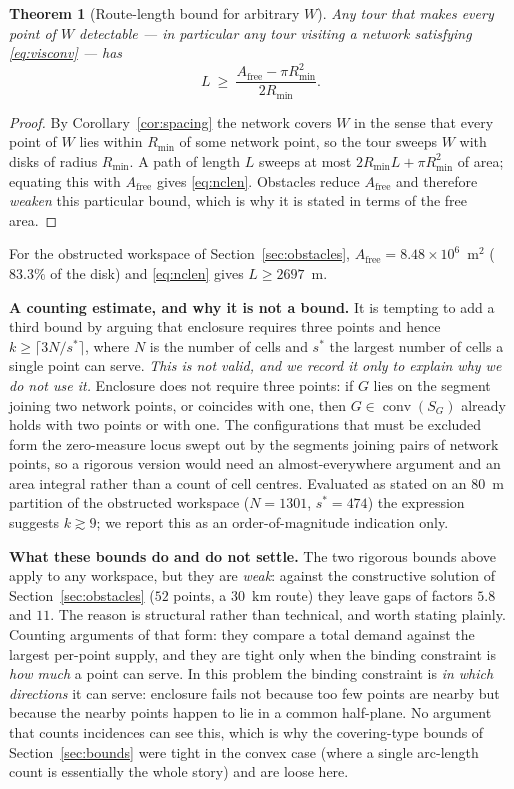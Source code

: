\documentclass[preprint,12pt,3p]{elsarticle}
\newtheorem{theorem}{Theorem}
\theoremstyle{definition}
\newenvironment{bproof}{\begin{proof}}{\end{proof}}
\newcommand{\conv}{\operatorname{conv}}
\newcommand{\Rmin}{R_{\min}}
\begin{document}
\begin{theorem}[Route-length bound for arbitrary $W$]
\label{thm:nclen}
Any tour that makes every point of $W$ detectable --- in particular any tour visiting a network
satisfying \eqref{eq:visconv} --- has
\begin{equation}
L\ \ge\ \frac{A_{\mathrm{free}}-\pi\Rmin^2}{2\Rmin}.
\label{eq:nclen}
\end{equation}
\end{theorem}
\begin{bproof}
By Corollary~\ref{cor:spacing} the network covers $W$ in the sense that every point of $W$ lies
within $\Rmin$ of some network point, so the tour sweeps $W$ with disks of radius $\Rmin$. A path
of length $L$ sweeps at most $2\Rmin L+\pi\Rmin^2$ of area; equating this with
$A_{\mathrm{free}}$ gives \eqref{eq:nclen}. Obstacles reduce $A_{\mathrm{free}}$ and therefore
\emph{weaken} this particular bound, which is why it is stated in terms of the free area.
\end{bproof}

For the obstructed workspace of Section~\ref{sec:obstacles},
$A_{\mathrm{free}}=8.48\times10^6$~m$^2$ ($83.3\%$ of the disk) and
\eqref{eq:nclen} gives $L\ge2697$~m.

\noindent\textbf{A counting estimate, and why it is not a bound.} It is tempting to add a third
bound by arguing that enclosure requires three points and hence
$k\ge\lceil 3N/s^\ast\rceil$, where $N$ is the number of cells and $s^\ast$ the largest number of
cells a single point can serve. \emph{This is not valid, and we record it only to explain why we do
not use it.} Enclosure does not require three points: if $G$ lies on the segment joining two
network points, or coincides with one, then $G\in\conv(S_G)$ already holds with two points or with
one. The configurations that must be excluded form the zero-measure locus swept out by the
segments joining pairs of network points, so a rigorous version would need an almost-everywhere
argument and an area integral rather than a count of cell centres. Evaluated as stated on an
$80$~m partition of the obstructed workspace ($N=1301$, $s^\ast=474$) the expression suggests
$k\gtrsim9$; we report this as an order-of-magnitude indication only.

\noindent\textbf{What these bounds do and do not settle.} The two rigorous bounds above apply to any workspace, but they are \emph{weak}: against the constructive solution of
Section~\ref{sec:obstacles} ($52$ points, a $30$~km route) they leave gaps of factors $5.8$ and
$11$. The reason is structural rather than technical, and worth stating plainly. Counting arguments of that form: they compare a total demand against the largest
per-point supply, and they are tight only when the binding constraint is \emph{how much} a point
can serve. In this problem the binding constraint is \emph{in which directions} it can serve:
enclosure fails not because too few points are nearby but because the nearby points happen to lie
in a common half-plane. No argument that counts incidences can see this, which is why the
covering-type bounds of Section~\ref{sec:bounds} were tight in the convex case (where a single
arc-length count is essentially the whole story) and are loose here.
\end{document}

